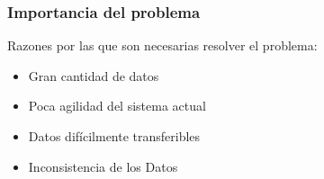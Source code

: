 \documentclass[14pt]{beamer}
\begin{document}
\begin{frame}
\begin{columns}
\begin{column}{0.5\textwidth}
\begin{center}

\end{center}
\end{column}
\end{columns}



\end{frame}


\begin{frame}
\frametitle{Importancia del problema}
Razones por las que son necesarias resolver el problema:
\begin{itemize}
\item Gran cantidad de datos
\item Poca agilidad del sistema actual
\item Datos difícilmente transferibles
\item Inconsistencia de los Datos
\end{itemize}

\end{frame}
\end{document}
